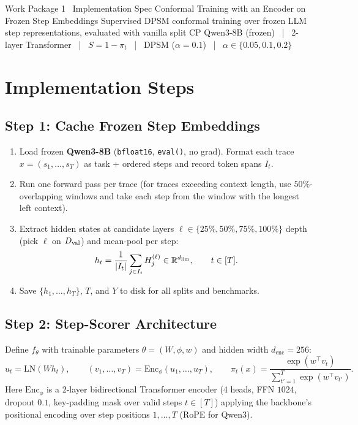 \documentclass[10pt,a4paper]{article}
\begin{document}
\wpheader
  {Work Package 1 \textperiodcentered\ Implementation Spec}
  {Conformal Training with an Encoder on Frozen Step Embeddings}
  {Supervised DPSM conformal training over frozen LLM step representations, evaluated with vanilla split CP}
  { Qwen3-8B (frozen) \ \textcolor{rulegray}{|}\ 
    2-layer Transformer \ \textcolor{rulegray}{|}\ 
    $S=1-\pi_t$ \ \textcolor{rulegray}{|}\ 
    DPSM ($\alpha=0.1$) \ \textcolor{rulegray}{|}\ 
    $\alpha\in\{0.05,0.1,0.2\}$}

\section{Implementation Steps}

\subsection{Step 1: Cache Frozen Step Embeddings}
\begin{enumerate}
\item Load frozen \textbf{Qwen3-8B} (\texttt{bfloat16}, \texttt{eval()}, no grad). Format each trace $x=(s_1,\dots,s_T)$ as task + ordered steps and record token spans $I_t$.
\item Run one forward pass per trace (for traces exceeding context length, use $50\%$-overlapping windows and take each step from the window with the longest left context).
\item Extract hidden states at candidate layers $\ell\in\{25\%,50\%,75\%,100\%\}$ depth (pick $\ell$ on $D_{\mathrm{val}}$) and mean-pool per step:
\[
h_t = \frac{1}{|I_t|}\sum_{j\in I_t} H_j^{(\ell)} \in \mathbb{R}^{d_{\mathrm{llm}}}, \qquad t\in[T].
\]
\item Save $\{h_1,\dots,h_T\}$, $T$, and $Y$ to disk for all splits and benchmarks.
\end{enumerate}

\subsection{Step 2: Step-Scorer Architecture}
Define $f_\theta$ with trainable parameters $\theta=(W, \phi, w)$ and hidden width $d_{\mathrm{enc}}=256$:
\begin{equation}
u_t = \mathrm{LN}(W h_t), \qquad
(v_1,\dots,v_T) = \mathrm{Enc}_\phi(u_1,\dots,u_T), \qquad
\pi_t(x) = \frac{\exp(w^\top v_t)}{\sum_{t'=1}^{T}\exp(w^\top v_{t'})}. \label{eq:wp1-arch}
\end{equation}
Here $\mathrm{Enc}_\phi$ is a 2-layer bidirectional Transformer encoder (4 heads, FFN $1024$, dropout $0.1$, key-padding mask over valid steps $t\in[T]$) applying the backbone's positional encoding over step positions $1,\dots,T$ (RoPE for Qwen3).
\end{document}
